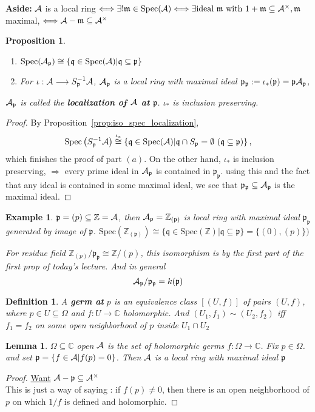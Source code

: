 \documentclass[11pt]{article}
\newtheorem{prop}[thm]{Proposition}
\newtheorem{lemma}[thm]{Lemma}
\newtheorem{dfn}[thm]{Definition}
\newtheorem{ex}[thm]{Example}
\newcommand{\cplx}{\mathbb C}
\newcommand{\intg}{\mathbb Z}
\newcommand{\scm}{{\mathfrak m}}
\newcommand{\scp}{{\mathfrak p}}
\newcommand{\scq}{\mathfrak q}
\newcommand{\cala}{{\cal A}}
\newcommand{\Lrta}{\Longrightarrow}
\newcommand{\lrta}{\longrightarrow}
\newcommand{\Llrta}{\Longleftrightarrow}
\begin{document}
\textbf{Aside:} $\cala$ is a local ring  $\Llrta\exists !\scm\in \text{Spec}(\cala)\Llrta \exists \text{ideal }\scm\text{ with }1+\scm\subseteq \cala^\times, \scm$ maximal,
$\Llrta \cala-\scm\subseteq \cala^\times$


\begin{prop}\ 
\begin{enumerate}[label=(\alph*)]
\item $\text{Spec}(\cala_\scp)\cong \{\scq\in \text{Spec}(\cala)|\scq\subseteq\scp\}$
\item For $\iota :\cala\lrta S^{-1}_{\scp}\cala$, $\cala_\scp$ is a local ring with maximal ideal $\scp_\scp:=\iota_*(\scp)=\scp\cala_\scp$,
\end{enumerate}
$\cala_\scp$ is called the \textbf{localization of $\cala$ at $\scp$}. $\iota_*$ is inclusion preserving.
\end{prop}
\begin{proof}
By Proposition~\ref{prop:iso_spec_localization},
$$
\text{Spec}\left(S^{-1}_{\scp}\cala\right)\overset{\iota_*}{\cong}\left\{\scq\in \text{Spec}(\cala)|\scq\cap S_\scp =\emptyset \ (\scq\subseteq \scp)\right\},
$$
which finishes the proof of part $(a)$. On the other hand,
$\iota_*$ is inclusion preserving,
$\Lrta$ every prime ideal in $\cala_\scp$ is contained in $\scp_\scp$. using this and the fact that any ideal is contained in some maximal ideal, we see that $\scp_\scp\subseteq \cala_\scp$ is the maximal ideal.
\end{proof}

\begin{ex}
$\scp=(p)\subseteq\intg=\cala$, then $\cala_\scp=\intg_{(\scp)}$ is local ring with maximal ideal $\scp_\scp$ generated by image of $\scp$. $\text{Spec}(\intg_{(\scp)})\cong \{\scq \in \text{Spec}(\intg)|\scq\subseteq \scp\}=\{(0),(p)\})$

For residue field $\intg_{(p)}/\scp_\scp\cong \intg/(p)$, this isomorphism is by the first part of the first prop of today's lecture. And in general
$$
\cala_\scp/\scp_\scp=k(\scp)
$$
\end{ex}


\begin{dfn}
A \textbf{germ at} $p$ is an equivalence class $[(U,f)]$ of pairs $(U,f)$, where $p\in U\subseteq \Omega$ and $f:U\lrta \cplx$ holomorphic. And $(U_1,f_1)\sim (U_2,f_2)$ iff $f_1=f_2$ on some open neighborhood of $p$ inside $U_1\cap U_2$
\end{dfn}
\begin{lemma}
$\Omega\subseteq \cplx$ open $\cala$ is the set of holomorphic germs $f:\Omega\lrta \cplx$. Fix $p\in\Omega$. and set $\scp=\{f\in \cala|f(p)=0\}$. Then $\cala$ is a local ring with maximal ideal $\scp$
\end{lemma}
\begin{proof}
\underline{Want} $\cala-\scp\subseteq \cala^\times$\\

This is just a way of saying : if $f(p)\neq 0$, then there is an open neighborhood of $p$ on which $1/f$ is defined and holomorphic.
\end{proof}
\end{document}
